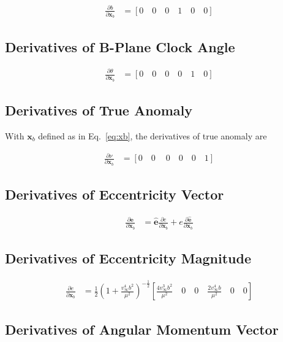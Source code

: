 \documentclass[]{article}
\newcommand{\vb}[1]{\bm{#1}} %
\newcommand{\vbh}[1]{\hat{\bm{#1}}} %
\newcommand{\pd}[2]{\frac{\partial #1}{\partial #2}} %
\newcommand{\xb}[0]{\vb{x}_b}
\begin{document}
\begin{align}
	\pd{b}{\xb} &= \left[ 0 \quad 0 \quad 0 \quad 1 \quad 0 \quad 0 \right]
\end{align}

\subsection{Derivatives of B-Plane Clock Angle}

\begin{align}
	\pd{\theta}{\xb} &= \left[ 0 \quad 0 \quad 0 \quad 0 \quad 1 \quad 0 \right]
\end{align}

\subsection{Derivatives of True Anomaly}

With $\vb{x}_b$ defined as in Eq.~\eqref{eq:xb}, the derivatives of true anomaly are

\begin{align}
	\pd{\nu}{\vb{x}_b} &= \left[ 0 \quad 0 \quad \ 0 \quad 0 \quad 0 \quad 1 \right]
\end{align}

\subsection{Derivatives of Eccentricity Vector}

\begin{align}
	\pd{\vb{e}}{\xb} &= \vbh{e} \pd{e}{\xb} + e \pd{\vbh{e}}{\xb}
\end{align}

\subsection{Derivatives of Eccentricity Magnitude}

\begin{align}
	\pd{e}{\xb} &= \frac{1}{2} \left( 1 + \frac{v_{\infty}^4 b^2}{\mu^2} \right)^{-\frac{1}{2}} \left[ \frac{4 v_{\infty}^3 b^2}{\mu^2} \quad 0 \quad 0 \quad \frac{2 v_{\infty}^4 b}{\mu^2} \quad 0 \quad 0 \right]
\end{align}

\subsection{Derivatives of Angular Momentum Vector}
\end{document}
